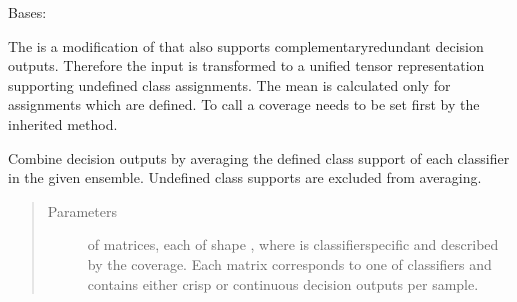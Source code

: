 \documentclass[letterpaper,10pt,english]{sphinxmanual}
\begin{document}

\begin{fulllineitems}
\label{\detokenize{pusion.core.simple_average_combiner:pusion.core.simple_average_combiner.CRSimpleAverageCombiner}}
\sphinxAtStartPar
Bases: {\hyperref[\detokenize{pusion.core.simple_average_combiner:pusion.core.simple_average_combiner.SimpleAverageCombiner}]{}}

\sphinxAtStartPar
The {\hyperref[\detokenize{pusion.core.simple_average_combiner:pusion.core.simple_average_combiner.CRSimpleAverageCombiner}]{}} is a modification of {\hyperref[\detokenize{pusion.core.simple_average_combiner:pusion.core.simple_average_combiner.SimpleAverageCombiner}]{}} that
also supports complementary\sphinxhyphen{}redundant decision outputs. Therefore the input is transformed to a unified
tensor representation supporting undefined class assignments. The mean is calculated only for assignments which
are defined. To call {\hyperref[\detokenize{pusion.core.simple_average_combiner:pusion.core.simple_average_combiner.CRSimpleAverageCombiner.combine}]{}} a coverage needs to be set first by the inherited  method.

\begin{fulllineitems}
\label{\detokenize{pusion.core.simple_average_combiner:pusion.core.simple_average_combiner.CRSimpleAverageCombiner.combine}}
\sphinxAtStartPar
Combine decision outputs by averaging the defined class support of each classifier in the given ensemble.
Undefined class supports are excluded from averaging.
\begin{quote}\begin{description}
\item[{Parameters}] \leavevmode
\sphinxAtStartPar
{} \textendash{}  of  matrices, each of shape ,
where  is classifier\sphinxhyphen{}specific and described by the coverage.
Each matrix corresponds to one of  classifiers and contains either crisp or continuous
decision outputs per sample.


\end{description}
\end{quote}
\end{fulllineitems}
\end{fulllineitems}
\end{document}
